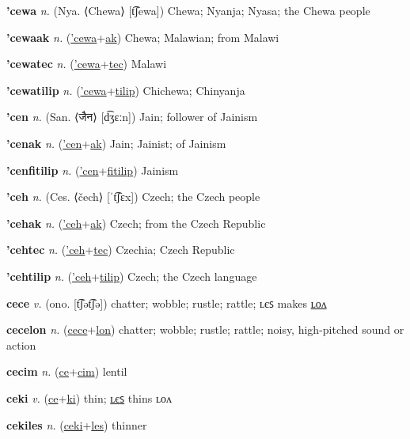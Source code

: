 \textbf{\hypertarget{'cewa}{'cewa}} \textit{n.} (Nya. ⟨Chewa⟩ [t͡ʃewa])
Chewa; Nyanja; Nyasa; the Chewa people

\textbf{\hypertarget{'cewaak}{'cewaak}} \textit{n.} (\hyperlink{'cewa}{'cewa}+\allowbreak \hyperlink{ak}{ak})
Chewa; Malawian; from Malawi

\textbf{\hypertarget{'cewatec}{'cewatec}} \textit{n.} (\hyperlink{'cewa}{'cewa}+\allowbreak \hyperlink{tec}{tec})
Malawi

\textbf{\hypertarget{'cewatilip}{'cewatilip}} \textit{n.} (\hyperlink{'cewa}{'cewa}+\allowbreak \hyperlink{tilip}{tilip})
Chichewa; Chinyanja

\textbf{\hypertarget{'cen}{'cen}} \textit{n.} (San. ⟨{\devanagari{}जैन}⟩ [d͡ʒɛːn])
Jain; follower of Jainism

\textbf{\hypertarget{'cenak}{'cenak}} \textit{n.} (\hyperlink{'cen}{'cen}+\allowbreak \hyperlink{ak}{ak})
Jain; Jainist; of Jainism

\textbf{\hypertarget{'cenfitilip}{'cenfitilip}} \textit{n.} (\hyperlink{'cen}{'cen}+\allowbreak \hyperlink{fitilip}{fitilip})
Jainism

\textbf{\hypertarget{'ceh}{'ceh}} \textit{n.} (Ces. ⟨čech⟩ [ˈt͡ʃɛx])
Czech; the Czech people

\textbf{\hypertarget{'cehak}{'cehak}} \textit{n.} (\hyperlink{'ceh}{'ceh}+\allowbreak \hyperlink{ak}{ak})
Czech; from the Czech Republic

\textbf{\hypertarget{'cehtec}{'cehtec}} \textit{n.} (\hyperlink{'ceh}{'ceh}+\allowbreak \hyperlink{tec}{tec})
Czechia; Czech Republic

\textbf{\hypertarget{'cehtilip}{'cehtilip}} \textit{n.} (\hyperlink{'ceh}{'ceh}+\allowbreak \hyperlink{tilip}{tilip})
Czech; the Czech language

\textbf{\hypertarget{cece}{cece}} \textit{v.} (ono. [t͡ʃət͡ʃə])
chatter; wobble; rustle; rattle; ʟєꜱ makes \hyperlink{cecelon}{ʟᴏᴧ}

\textbf{\hypertarget{cecelon}{cecelon}} \textit{n.} (\hyperlink{cece}{cece}+\allowbreak \hyperlink{lon}{lon})
chatter; wobble; rustle; rattle; noisy, high-pitched sound or action

\textbf{\hypertarget{cecim}{cecim}} \textit{n.} (\hyperlink{ce}{ce}+\allowbreak \hyperlink{cim}{cim})
lentil

\textbf{\hypertarget{ceki}{ceki}} \textit{v.} (\hyperlink{ce}{ce}+\allowbreak \hyperlink{ki}{ki})
thin; \hyperlink{cekiles}{ʟєꜱ} thins ʟᴏᴧ

\textbf{\hypertarget{cekiles}{cekiles}} \textit{n.} (\hyperlink{ceki}{ceki}+\allowbreak \hyperlink{les}{les})
thinner

